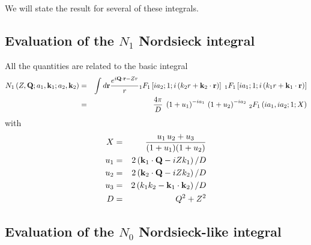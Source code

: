 We will state the result for several of these integrals.

\subsection{Evaluation of the $N_{1}$ Nordsieck integral}

All the quantities are related to the basic integral
%
\begin{eqnarray} \label{Q:N1}
N_{1} \left(Z,  \mathbf{Q} ; a_{1}, \mathbf{k}_{1} ; a_{2}, \mathbf{k}_{2} \right)
  &=& \int d \mathbf{r} \frac{e^{i \mathbf{Q} \cdot \mathbf{r} - Z
r}}{r} {_{1}F_{1}} \left[ i a_{2} ; 1 ;i \left(k_{2} r +
\mathbf{k}_{2}\cdot \mathbf{r} \right)\right] \; {_{1}F_{1}} \left[ i a_{1}
; 1 ;i \left(k_{1} r + \mathbf{k}_{1}\cdot \mathbf{r} \right)\right]
  \nonumber \\
 &=& \frac{4 \pi}{D} \; \left( 1 + u_{1} \right)^{-i
a_{1}} \, \left( 1 + u_{2} \right)^{-i a_{2}} \, {_{2}F_{1}}\left(
i a_{1} , i a_{2} ; 1 ; X \right)
\end{eqnarray}
with
\begin{eqnarray} \label{Q:XuD}
X &=& \frac{u_{1} \, u_{2} +u_{3}}{(1 + u_{1}) (1 + u_{2})} \nonumber
\\
u_{1} &=& 2 \left( \mathbf{k}_{1}\cdot \mathbf{Q} - i Z k_{1}
\right)/D \nonumber \\
u_{2} &=& 2 \left( \mathbf{k}_{2}\cdot \mathbf{Q} - i Z k_{2}
\right)/D \\
u_{3} &=& 2 \left( k_{1} k_{2} - \mathbf{k}_{1}\cdot \mathbf{k}_{2} \right)/D
 \nonumber \\
D &=& Q^{2} + Z^{2} \nonumber
\end{eqnarray}
%

\subsection{Evaluation of the $N_{0}$ Nordsieck-like integral}

